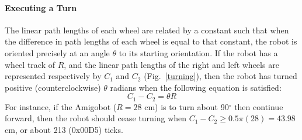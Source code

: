 \paragraph{Executing a Turn}\label{exturn}
\begin{figure}[h!]
\centering
\cprotect {}
\end{figure}

The linear path lengths of each wheel are related by a constant such
that when the difference in path lengths of each wheel is equal to that
constant, the robot is oriented precisely at an angle \(\theta\) to its starting
orientation. If the robot has a wheel track of \(R\),
and the linear path lengths of the right and left wheels are
represented respectively by \(C_1\) and \(C_2\) (Fig.~\ref{turning}), then the robot has
turned positive (counterclockwise) \(\theta\) radians when the following equation is satisfied:
\begin{equation}
C_1 - C_2 = \theta R
\end{equation}
For instance, if the Amigobot (\(R = 28\) cm) is to turn about
90\(^\circ\) then continue forward, 
then the robot should cease turning when \(C_1-C_2 \geq 0.5\pi
(28) = 43.98\) cm, or about 213 (0x00D5) ticks. 

